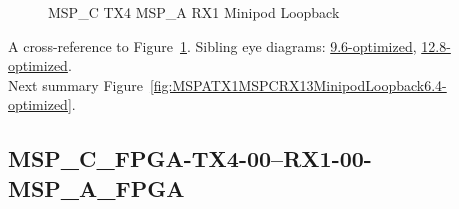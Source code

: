 \begin{figure}[h]
\begin{subfigure}{0.33\textwidth}
\hyperref[sec:MSPCFPGATX406RX106MSPAFPGA6.4-optimized]{}
\end{subfigure}\hspace*{\fill}
\begin{subfigure}{0.33\textwidth}
\hyperref[sec:MSPCFPGATX407RX107MSPAFPGA6.4-optimized]{}
\end{subfigure}\hspace*{\fill}
\begin{subfigure}{0.33\textwidth}
\hyperref[sec:MSPCFPGATX408RX108MSPAFPGA6.4-optimized]{}
\end{subfigure}

\begin{subfigure}{0.33\textwidth}
\hyperref[sec:MSPCFPGATX409RX109MSPAFPGA6.4-optimized]{}
\end{subfigure}\hspace*{\fill}
\begin{subfigure}{0.33\textwidth}
\hyperref[sec:MSPCFPGATX410RX110MSPAFPGA6.4-optimized]{}
\end{subfigure}\hspace*{\fill}
\begin{subfigure}{0.33\textwidth}
\hyperref[sec:MSPCFPGATX411RX111MSPAFPGA6.4-optimized]{}
\end{subfigure}

\caption{MSP\_C TX4 MSP\_A RX1 Minipod Loopback} \label{fig:MSPCTX4MSPARX1MinipodLoopback6.4-optimized}
\end{figure}

A cross-reference to Figure~\ref{fig:MSPCTX4MSPARX1MinipodLoopback6.4-optimized}.
Sibling eye diagrams: \hyperref[sec:MSPCTX4MSPARX1MinipodLoopback9.6-optimized]{9.6-optimized}, \hyperref[sec:MSPCTX4MSPARX1MinipodLoopback12.8-optimized]{12.8-optimized}. \\
Next summary Figure~\ref{fig:MSPATX1MSPCRX13MinipodLoopback6.4-optimized}.
\clearpage
% 
\subsection{MSP\_C\_FPGA-TX4-00--RX1-00-MSP\_A\_FPGA}\label{sec:MSPCFPGATX400RX100MSPAFPGA6.4-optimized}

